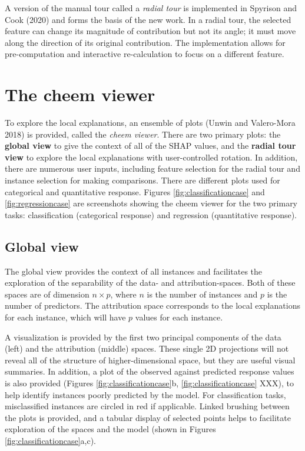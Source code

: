 \documentclass[
]{article}
\begin{document}
A version of the manual tour called a \emph{radial tour} is implemented in Spyrison and Cook (2020) and forms the basis of the new work. In a radial tour, the selected feature can change its magnitude of contribution but not its angle; it must move along the direction of its original contribution. The implementation allows for pre-computation and interactive re-calculation to focus on a different feature.

\hypertarget{sec:cheemviwer}{%
\section{The cheem viewer}\label{sec:cheemviwer}}

To explore the local explanations, an ensemble of plots (Unwin and Valero-Mora 2018) is provided, called the \emph{cheem viewer}. There are two primary plots: the \textbf{global view} to give the context of all of the SHAP values, and the \textbf{radial tour view} to explore the local explanations with user-controlled rotation. In addition, there are numerous user inputs, including feature selection for the radial tour and instance selection for making comparisons. There are different plots used for categorical and quantitative response. Figures \ref{fig:classificationcase} and \ref{fig:regressioncase} are screenshots showing the cheem viewer for the two primary tasks: classification (categorical response) and regression (quantitative response).

\hypertarget{global-view}{%
\subsection{Global view}\label{global-view}}

The global view provides the context of all instances and facilitates the exploration of the separability of the data- and attribution-spaces. Both of these spaces are of dimension \(n\times p\), where \(n\) is the number of instances and \(p\) is the number of predictors. The attribution space corresponds to the local explanations for each instance, which will have \(p\) values for each instance.

A visualization is provided by the first two principal components of the data (left) and the attribution (middle) spaces. These single 2D projections will not reveal all of the structure of higher-dimensional space, but they are useful visual summaries. In addition, a plot of the observed against predicted response values is also provided (Figures \ref{fig:classificationcase}b, \ref{fig:classificationcase} XXX), to help identify instances poorly predicted by the model. For classification tasks, misclassified instances are circled in red if applicable. Linked brushing between the plots is provided, and a tabular display of selected points helps to facilitate exploration of the spaces and the model (shown in Figures \ref{fig:classificationcase}a,c).
\end{document}
